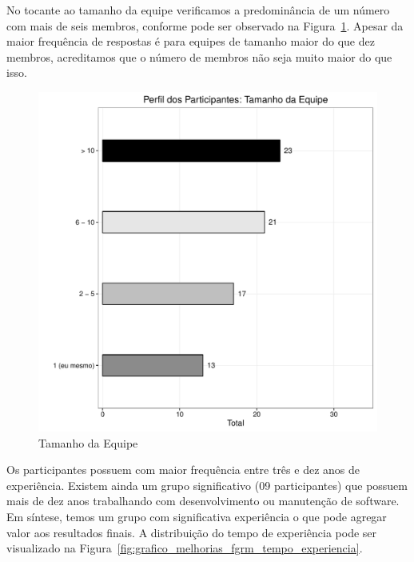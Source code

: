 No tocante ao tamanho da equipe verificamos a predominância de um número com
mais de seis membros, conforme pode ser observado na
Figura~\ref{fig:grafico_melhorias_fgrm_tamanho_equipe}. Apesar da maior
frequência de respostas é para equipes de tamanho maior do que dez membros,
acreditamos que o número de membros não seja muito maior do que isso.

\begin{figure}[htpb]
	\centering
	\includegraphics[width=0.8\linewidth]{./chapter-pesquisa-com-profissionais/img/grafico_melhorias_fgrm_tamanho_equipe.pdf}
	\caption{Tamanho da Equipe}
\label{fig:grafico_melhorias_fgrm_tamanho_equipe}
\end{figure}

Os participantes possuem com maior frequência entre três e dez anos de
experiência. Existem ainda um grupo significativo (09 participantes) que possuem
mais de dez anos trabalhando com desenvolvimento ou manutenção de software. Em
síntese, temos um grupo com significativa experiência o que pode agregar valor
aos resultados finais. A distribuição do tempo de experiência pode ser
visualizado na Figura~\ref{fig:grafico_melhorias_fgrm_tempo_experiencia}.

